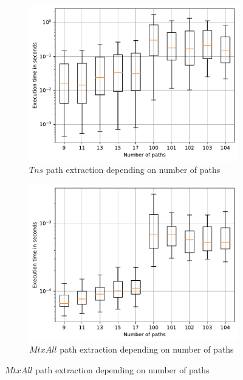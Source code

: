 \begin{figure}
	\begin{subfigure}{0.32\textwidth}
		\includegraphics[width=\linewidth,trim=0 0 -1.5cm 0]{pictures/tensor_go_10_big_small.pdf}
		\caption{$Tns$ path extraction depending on number of paths} \label{fig:extractTimeGoMtx}
	\end{subfigure}
	\hspace*{\fill}
	\begin{subfigure}{0.32\textwidth}
		\includegraphics[width=\linewidth,trim=0 0 -1.5cm 0]{pictures/allMatr_go_10_big_small.pdf}
		\caption{$MtxAll$ path extraction depending on number of paths} \label{fig:extractTimeGoTns}
	\end{subfigure}

\end{figure}
